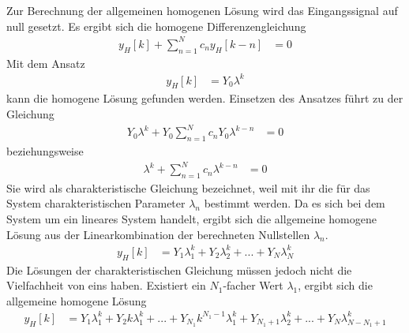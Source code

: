 Zur Berechnung der allgemeinen homogenen Lösung wird das Eingangssignal auf null gesetzt. Es ergibt sich die homogene Differenzengleichung
\begin{align}
y_{H}[ k] + \sum\limits_{n = 1}^{N}{c_{n}  y_{H}[ k - n]} &= 0 \label{eq:4.47}
\end{align}
Mit dem Ansatz
\begin{align}
y_{H}[ k] &= Y_{0}  \lambda^{k} \label{eq:4.48}
\end{align}
kann die homogene Lösung gefunden werden. Einsetzen des Ansatzes führt zu der Gleichung
\begin{align}
Y_{0}  \lambda^{k} + Y_{0}  \sum\limits_{n = 1}^{N}{c_{n}  Y_{0}  \lambda^{k - n}} &= 0 \label{eq:4.49}
\end{align}
beziehungsweise
\begin{align}
\lambda^{k} + \sum\limits_{n = 1}^{N}{c_{n}  \lambda^{k - n}} &= 0 \label{eq:4.50}
\end{align}
Sie wird als charakteristische Gleichung bezeichnet, weil mit ihr die für das System charakteristischen Parameter \(λ_{n}\) bestimmt werden. Da es sich bei dem System um ein lineares System handelt, ergibt sich die allgemeine homogene Lösung aus der Linearkombination der berechneten Nullstellen \(λ_{n}\).
\begin{align}
y_{H}[ k] &= Y_{1}  \lambda_{1}^{k} + Y_{2}  \lambda_{2}^{k} + ... + Y_{N}  \lambda_{N}^{k} \label{eq:4.51}
\end{align}
Die Lösungen der charakteristischen Gleichung müssen jedoch nicht die Vielfachheit von eins haben. Existiert ein \(N_{1}\)-facher Wert \(λ_{1}\), ergibt sich die allgemeine homogene Lösung
\begin{align}
y_{H}[ k] &= Y_{1}  \lambda_{1}^{k} + Y_{2}  k  \lambda_{1}^{k} + ... + Y_{N_{1}}  k^{N_{1} - 1}  \lambda_{1}^{k} + Y_{N_{1} + 1}  \lambda_{2}^{k} + ... + Y_{N}  \lambda_{N - N_{1} + 1}^{k} \label{eq:4.52}
\end{align}
